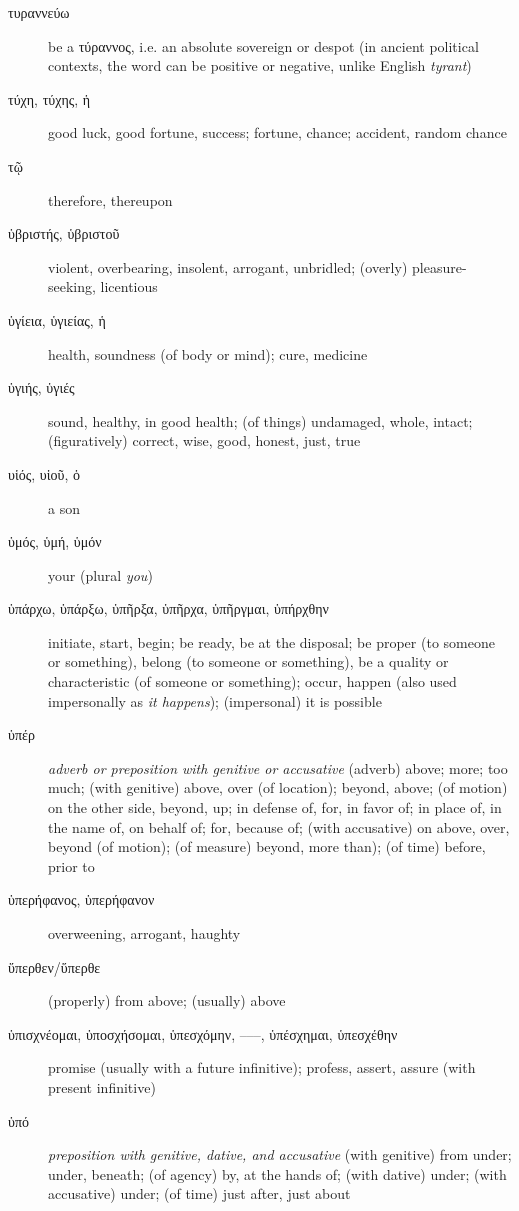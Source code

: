 \documentclass[12pt,letterpaper]{article}
\begin{document}
\begin{description}
    \item[\textgreek{τυραννεύω}] be a \textgreek{τύραννος}, i.e. an absolute sovereign or despot (in ancient political contexts, the word can be positive or negative, unlike English \textit{tyrant})
    \item[\textgreek{τύχη, τύχης, ἡ}] \marginnote{*}good luck, good fortune, success; fortune, chance; accident, random chance
    \item[\textgreek{τῷ}] therefore, thereupon
    \item[\textgreek{ὑβριστής, ὑβριστοῦ}] violent, overbearing, insolent, arrogant, unbridled; (overly) pleasure-seeking, licentious
    \item[\textgreek{ὑγίεια, ὑγιείας, ἡ}] health, soundness (of body or mind); cure, medicine
    \item[\textgreek{ὑγιής, ὑγιές}] sound, healthy, in good health; (of things) undamaged, whole, intact; (figuratively) correct, wise, good, honest, just, true
    \item[\textgreek{υἱός, υἱοῦ, ὁ}] \marginnote{*}a son
    \item[\textgreek{ὑμός, ὑμή, ὑμόν}] your (plural \textit{you})
    \item[\textgreek{ὑπάρχω, ὑπάρξω, ὑπῆρξα, ὑπῆρχα, ὑπῆργμαι, ὑπήρχθην}] \marginnote{*}initiate, start, begin; be ready, be at the disposal; be proper (to someone or something), belong (to someone or something), be a quality or characteristic (of someone or something); occur, happen (also used impersonally as \textit{it happens}); (impersonal) it is possible
    \item[\textgreek{ὑπέρ}] \marginnote{*}\textit{adverb or preposition with genitive or accusative} (adverb) above; more; too much; (with genitive) above, over (of location); beyond, above; (of motion) on the other side, beyond, up; in defense of, for, in favor of; in place of, in the name of, on behalf of; for, because of; (with accusative) on above, over, beyond (of motion); (of measure) beyond, more than); (of time) before, prior to
    \item[\textgreek{ὑπερήφανος, ὑπερήφανον}] overweening, arrogant, haughty
    \item[\textgreek{ὕπερθεν/ὕπερθε}] (properly) from above; (usually) above
    \item[\textgreek{ὑπισχνέομαι, ὑποσχήσομαι, ὑπεσχόμην, –––, ὑπέσχημαι, ὑπεσχέθην}] promise (usually with a future infinitive); profess, assert, assure (with present infinitive)
    \item[\textgreek{ὑπό}] \marginnote{*}\textit{preposition with genitive, dative, and accusative} (with genitive) from under; under, beneath; (of agency) by, at the hands of; (with dative) under; (with accusative) under; (of time) just after, just about

\end{description}
\end{document}
